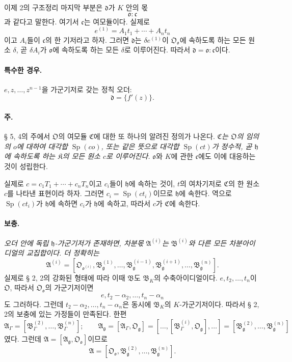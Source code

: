 이제 2의 구조정리 마지막 부분은 \(\mathfrak d\)가 \(K\) 안의 몫
\[
\mathfrak o:\mathfrak c
\]
과 같다고 말한다. 여기서 \(\mathfrak c\)는 여모듈이다. 실제로
\[
e^{(1)}=A_1t_1+\cdots+A_nt_n
\]
이고 \(A_i\)들이 \(\mathfrak c\)의 한 기저라고 하자. 그러면 \(\mathfrak d\)는 \(\delta e^{(1)}\)이 \(\mathfrak O_{\mathfrak o}\)에 속하도록 하는 모든 원소 \(\delta\), 곧 \(\delta A_i\)가 \(\mathfrak o\)에 속하도록 하는 모든 \(\delta\)로 이루어진다. 따라서 \(\mathfrak d=\mathfrak o:\mathfrak c\)이다.

\paragraph{특수한 경우.}
\(e,z,\ldots,z^{n-1}\)을 가군기저로 갖는 정칙 오더:
\[
\mathfrak d=\{f'(z)\}.
\]

\paragraph{주.}
§ 5, 4의 주에서 \(\mathfrak O\)의 여모듈 \(\mathfrak C\)에 대한 또 하나의 알려진 정의가 나온다. \emph{\(\mathfrak C\)는 \(\mathfrak O\)의 임의의 \(o\)에 대하여 대각합 \(\operatorname{Sp}(co)\), 또는 같은 뜻으로 대각합 \(\operatorname{Sp}(ct)\)가 정수적, 곧 \(\mathfrak h\)에 속하도록 하는 \(\mathfrak K\)의 모든 원소 \(c\)로 이루어진다.} \(\mathfrak o\)와 \(K\)에 관한 \(\mathfrak c\)에도 이에 대응하는 것이 성립한다.

실제로 \(c=c_1T_1+\cdots+c_nT_n\)이고 \(c_i\)들이 \(\mathfrak h\)에 속하는 것이, \(t\)의 여차기저로 \(\mathfrak C\)의 한 원소 \(c\)를 나타낸 표현이라 하자. 그러면 \(c_i=\operatorname{Sp}(ct_i)\)이므로 \(\mathfrak h\)에 속한다. 역으로 \(\operatorname{Sp}(ct_i)\)가 \(\mathfrak h\)에 속하면 \(c_i\)가 \(\mathfrak h\)에 속하고, 따라서 \(c\)가 \(\mathfrak C\)에 속한다.

\paragraph{보충.}
\emph{오더 안에 독립 \(\mathfrak h\)-가군기저가 존재하면, 차분몫 \(\mathfrak A^{(i)}\)는 \(\mathfrak B^{(i)}\)와 다른 모든 차분아이디얼의 교집합이다. 더 정확히는}
\[
\mathfrak A^{(i)}=
[\mathfrak O_{\mathfrak o^{(i)}},
\mathfrak B_{\mathfrak g}^{(1)},\ldots,
\mathfrak B_{\mathfrak g}^{(i-1)},
\mathfrak B_{\mathfrak g}^{(i+1)},\ldots,
\mathfrak B_{\mathfrak g}^{(n)}].
\]
실제로 § 2, 2의 강화된 형태에 따라 이때 \(\mathfrak B\)도 \(\mathfrak B_K\)의 수축아이디얼이다. \(e,t_2,\ldots,t_n\)이 \(\mathfrak O\), 따라서 \(\mathfrak O_{\mathfrak o}\)의 가군기저이면
\[
e,t_2-\alpha_2,\ldots,t_n-\alpha_n
\]
도 그러하다. 그런데 \(t_2-\alpha_2,\ldots,t_n-\alpha_n\)은 동시에 \(\mathfrak B_K\)의 \(K\)-가군기저이다. 따라서 § 2, 2의 보충에 있는 가정들이 만족된다. 한편
\[
\mathfrak A_\Gamma=[\mathfrak B_\Gamma^{(2)},\ldots,\mathfrak B_\Gamma^{(n)}];
\qquad
\mathfrak A_\mathfrak g=[\mathfrak A_\Gamma,\mathfrak O_\mathfrak g]
=[\ldots,[\mathfrak B_\Gamma^{(i)},\mathfrak O_\mathfrak g],\ldots]
=[\mathfrak B_\mathfrak g^{(2)},\ldots,\mathfrak B_\mathfrak g^{(n)}]
\]
였다. 그런데 \(\mathfrak A=[\mathfrak A_\mathfrak g,\mathfrak O_{\mathfrak o}]\)이므로
\[
\mathfrak A=[\mathfrak O_{\mathfrak o},\mathfrak B_\mathfrak g^{(2)},\ldots,\mathfrak B_\mathfrak g^{(n)}].
\]

